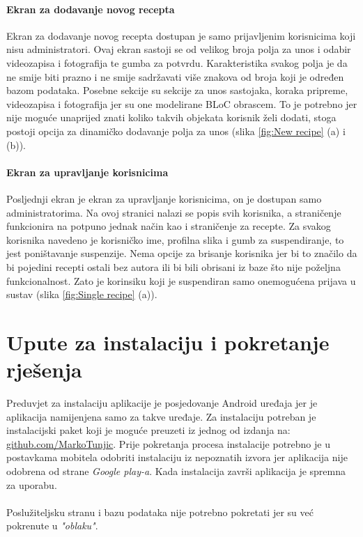 \documentclass[times, utf8, zavrsni]{fer}
\begin{document}
\subsubsection{Ekran za dodavanje novog recepta}
Ekran za dodavanje novog recepta dostupan je samo prijavljenim korisnicima koji nisu administratori.
Ovaj ekran sastoji se od velikog broja polja za unos i odabir videozapisa i fotografija te gumba za potvrdu.
Karakteristika svakog polja je da ne smije biti prazno i ne smije sadržavati više znakova od broja koji
je određen bazom podataka. Posebne sekcije su sekcije za unos sastojaka, koraka pripreme, videozapisa i
fotografija jer su one modelirane BLoC obrascem. To je potrebno jer nije moguće unaprijed znati koliko
takvih objekata korisnik želi dodati, stoga postoji opcija za dinamičko dodavanje
polja za unos (slika \ref{fig:New recipe} (a) i (b)).

\subsubsection{Ekran za upravljanje korisnicima}
Posljednji ekran je ekran za upravljanje korisnicima, on je dostupan samo administratorima. Na ovoj stranici nalazi se
popis svih korisnika, a straničenje funkcionira na potpuno jednak način kao i straničenje za recepte.
Za svakog korisnika navedeno je korisničko ime, profilna slika i gumb za suspendiranje, to jest
poništavanje suspenzije. Nema opcije za brisanje korisnika jer bi to značilo da bi pojedini recepti
ostali bez autora ili bi bili obrisani iz baze što nije poželjna funkcionalnost. Zato je korinsiku koji je suspendiran
samo onemogućena prijava u sustav (slika \ref{fig:Single recipe} (a)).

\chapter{Upute za instalaciju i pokretanje rješenja}
Preduvjet za instalaciju aplikacije je posjedovanje Android uređaja jer je aplikacija namijenjena samo
za takve uređaje. Za instalaciju potreban je instalacijski paket koji je moguće preuzeti iz jednog od izdanja
na: \href{https://github.com/MarkoTunjic/Final-BSc-Thesis}{github.com/MarkoTunjic}. Prije pokretanja
procesa instalacije potrebno je u postavkama mobitela odobriti instalaciju iz nepoznatih izvora jer aplikacija
nije odobrena od strane \textit{Google play-a}. Kada instalacija završi aplikacija je spremna za uporabu.
\\\\
Poslužiteljsku stranu i bazu podataka nije potrebno pokretati jer su već pokrenute u \textit{"oblaku"}.
\end{document}
